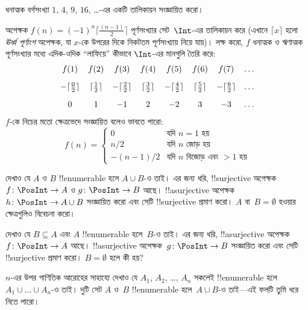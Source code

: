 \documentclass[../../../include/open-logic-section]{subfiles}
\begin{document}
\begin{prob}
ধনাত্মক বর্গসংখ্যা $1$, $4$, $9$, $16$, \dots{}-এর একটি তালিকায়ন সংজ্ঞায়িত করো।
\end{prob}

\begin{ex}
অপেক্ষক $f(n) = (-1)^{n} \lceil \frac{(n-1)}{2}\rceil$ পূর্ণসংখ্যার সেট~$\Int$-এর তালিকায়ন করে (এখানে $\lceil x \rceil$ হলো \emph{ঊর্ধ্ব পূর্ণাংশ} অপেক্ষক, যা $x$-কে উপরের দিকে নিকটতম পূর্ণসংখ্যায় নিয়ে যায়)। লক্ষ করো, $f$ ধনাত্মক ও ঋণাত্মক পূর্ণসংখ্যার মধ্যে এদিক-ওদিক ``লাফিয়ে'' কীভাবে $\Int$-এর মানগুলি তৈরি করে:
\[
\begin{array}{c c c c c c c c}
f(1) & f(2) & f(3) & f(4) & f(5) & f(6) & f(7) & \dots \\ \\[-3pt]
- \lceil \tfrac{0}{2} \rceil & \lceil \tfrac{1}{2}\rceil & - \lceil \tfrac{2}{2} \rceil & \lceil \tfrac{3}{2} \rceil & - \lceil \tfrac{4}{2} \rceil  & \lceil \tfrac{5}{2}
\rceil & - \lceil \tfrac{6}{2} \rceil & \dots \\ \\[-3pt]
0 & 1 & -1 & 2 & -2 & 3 & -3 & \dots
\end{array}
\] 
$f$-কে নিচের মতো ক্ষেত্রভেদে সংজ্ঞায়িত বলেও ভাবতে পারো:
\[
f(n) = \begin{cases}
  0 & \text{যদি $n = 1$ হয়}\\
  n/2 & \text{যদি $n$ জোড় হয়}\\
  -(n-1)/2 & \text{যদি $n$ বিজোড় এবং $>1$ হয়}
  \end{cases}
\]
\end{ex}

\begin{prob}
  দেখাও যে $A$ ও $B$ !!{enumerable} হলে $A \cup B$-ও তাই। এর জন্য ধরি, !!{surjective} অপেক্ষক $f\colon \PosInt \to
  A$ ও $g\colon \PosInt \to B$ আছে। !!a{surjective} অপেক্ষক~$h\colon \PosInt \to A \cup B$ সংজ্ঞায়িত করো এবং সেটি !!{surjective} প্রমাণ করো। $A$ বা~$B = \emptyset$ হওয়ার ক্ষেত্রগুলিও বিবেচনা করো।
\end{prob}

\begin{prob}
  দেখাও যে $B \subseteq A$ এবং $A$ !!{enumerable} হলে~$B$-ও তাই। এর জন্য ধরি, !!a{surjective} অপেক্ষক $f\colon \PosInt \to
  A$ আছে। !!a{surjective} অপেক্ষক~$g\colon \PosInt \to B$ সংজ্ঞায়িত করো এবং সেটি !!{surjective} প্রমাণ করো। $B = \emptyset$ হলে কী হয়?
\end{prob}

\begin{prob}
  $n$-এর উপর গাণিতিক আরোহের সাহায্যে দেখাও যে $A_1$, $A_2$, \dots, $A_n$ সকলেই !!{enumerable} হলে $A_1 \cup \dots \cup A_n$-ও তাই। দুটি সেট $A$ ও~$B$ !!{enumerable} হলে~$A \cup
  B$-ও তাই—এই ফলটি তুমি ধরে নিতে পারো।
\end{prob}
\end{document}
